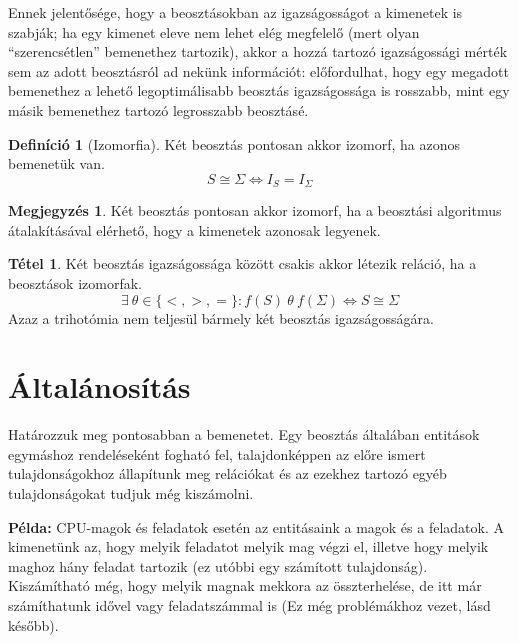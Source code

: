 \documentclass{article}
\theoremstyle{definition}
\newtheorem{definition}{Definíció}[section]
\newtheorem{theorem}{Tétel}[section]
\newtheorem*{megj}{Megjegyzés}
\newcommand{\set}[1]{ \{ {#1} \} }
\newcommand{\pl}{ \textbf{Példa:} }
\begin{document}
\begin{multicols}{2}
    Ennek jelentősége, hogy a beosztásokban az igazságosságot a kimenetek is szabják; ha egy kimenet eleve nem lehet elég megfelelő (mert olyan \enquote{szerencsétlen} bemenethez tartozik), akkor a hozzá tartozó igazságossági mérték sem az adott beosztásról ad nekünk információt: előfordulhat, hogy egy megadott bemenethez a lehető legoptimálisabb beosztás igazságossága is rosszabb, mint egy másik bemenethez tartozó legrosszabb beosztásé.
    
    \begin{definition}[Izomorfia]
        Két beosztás pontosan akkor izomorf, ha azonos bemenetük van.
        \begin{equation} S \cong \Sigma \Longleftrightarrow I_S = I_\Sigma \end{equation}
        \begin{megj}
            Két beosztás pontosan akkor izomorf, ha a beosztási algoritmus átalakításával elérhető, hogy a kimenetek azonosak legyenek.
        \end{megj}
    \end{definition}
    
    \begin{theorem}\label{thm:trihotomia}
        Két beosztás igazságossága között csakis akkor létezik reláció, ha a beosztások izomorfak.
        \begin{equation} \exists \ \theta \in \set{<, >, =}: f(S)\ \theta\ f(\Sigma) \Longleftrightarrow S \cong \Sigma \end{equation}
        Azaz a trihotómia nem teljesül bármely két beosztás igazságosságára.
    \end{theorem}
    
\section{Általánosítás}
    
    Határozzuk meg pontosabban a bemenetet. Egy beosztás általában entitások egymáshoz rendeléseként fogható fel, talajdonképpen az előre ismert tulajdonságokhoz állapítunk meg relációkat és az ezekhez tartozó egyéb tulajdonságokat tudjuk még kiszámolni.
    
    \pl CPU-magok és feladatok esetén az entitásaink a magok és a feladatok. A kimenetünk az, hogy melyik feladatot melyik mag végzi el, illetve hogy melyik maghoz hány feladat tartozik (ez utóbbi egy számított tulajdonság). Kiszámítható még, hogy melyik magnak mekkora az összterhelése, de itt már számíthatunk idővel vagy feladatszámmal is (Ez még problémákhoz vezet, lásd később).
    

\end{multicols}
\end{document}
